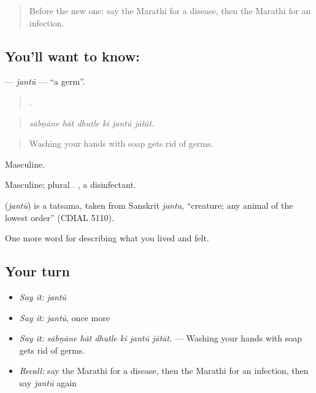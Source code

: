 \label{lesson:MR-C484-jantu}



\begin{quote}
Before the new one: say the Marathi for a disease, then the Marathi for an infection.
\end{quote}

\subsection*{You'll want to know: }
\textbf{} — \emph{jantū} — \textquotedblleft{}a germ\textquotedblright{}.

\begin{quote}
     .
\end{quote}

\begin{quote}
\emph{sābṇāne hāt dhutle kī jantū jātāt.}
\end{quote}

\begin{quote}
Washing your hands with soap gets rid of germs.
\end{quote}

Masculine.

Masculine; plural . , a disinfectant.

\begin{cousinweb}
\textbf{} (\emph{jantū}) is a tatsama, taken from Sanskrit \emph{jantu}, \textquotedblleft{}creature; any animal of the lowest order\textquotedblright{} (CDIAL 5110).
\end{cousinweb}

\begin{grammarlens}[title={What you've built}]
One more word for describing what you lived and felt.
\end{grammarlens}

\subsection*{Your turn}
\begin{itemize}
\raggedright
  \item \emph{Say it:} \emph{jantū}
  \item \emph{Say it:} \emph{jantū}, once more
  \item \emph{Say it:} \emph{sābṇāne hāt dhutle kī jantū jātāt.} — Washing your hands with soap gets rid of germs.
  \item \emph{Recall:} say the Marathi for a disease, then the Marathi for an infection, then say \emph{jantū} again
\end{itemize}

